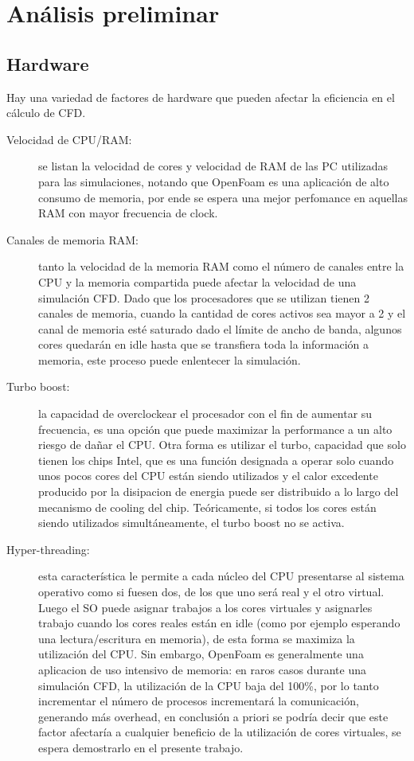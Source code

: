 \documentclass{article}
\begin{document}
\newpage
\section{Análisis preliminar}
\subsection{Hardware}
Hay una variedad de factores de hardware que pueden afectar la eficiencia en el cálculo de CFD.
\begin{description}
    \item [Velocidad de CPU/RAM:] se listan la velocidad de cores y velocidad de RAM de las PC utilizadas para las simulaciones, notando que OpenFoam es una aplicación de alto consumo de memoria, por ende se espera una mejor perfomance en aquellas RAM con mayor frecuencia de clock.
    \item [Canales de memoria RAM:] tanto la velocidad de la memoria RAM como el número de canales entre la CPU y la memoria compartida puede afectar la velocidad de una simulación CFD. Dado que los procesadores que se utilizan tienen 2 canales de memoria, cuando la cantidad de cores activos sea mayor a 2 y el canal de memoria esté saturado dado el límite de ancho de banda, algunos cores quedarán en idle hasta que se transfiera toda la información a memoria, este proceso puede enlentecer la simulación.
    \item [Turbo boost:] la capacidad de overclockear el procesador con el fin de aumentar su frecuencia, es una  opción que puede maximizar la performance a un alto riesgo de dañar el CPU. Otra forma es utilizar el turbo, capacidad que solo tienen los chips Intel, que es una función designada a operar solo cuando unos pocos cores del CPU están siendo utilizados y el calor excedente producido por la disipacion de energia puede ser distribuido a lo largo del mecanismo de cooling del chip. Teóricamente, si todos los cores están siendo utilizados simultáneamente, el turbo boost no se activa.
    \item [Hyper-threading:] esta característica le permite a cada núcleo del CPU presentarse al sistema operativo como si fuesen dos, de los que uno será real y el otro virtual. Luego el SO puede asignar trabajos a los cores virtuales y asignarles trabajo cuando los cores reales están en idle (como por ejemplo esperando una lectura/escritura en memoria), de esta forma se maximiza la utilización del CPU. Sin embargo, OpenFoam es generalmente una aplicacion de uso intensivo de memoria: en raros casos durante una simulación CFD, la utilización de la CPU baja del 100\%, por lo tanto incrementar el número de procesos incrementará la comunicación, generando más overhead, en conclusión a priori se podría decir que este factor afectaría a cualquier beneficio de la utilización de cores virtuales, se espera demostrarlo en el presente trabajo.
\end{description}
\end{document}
